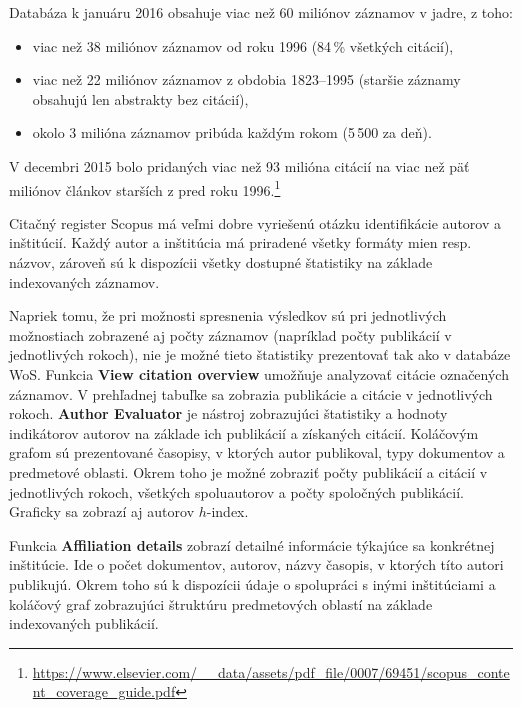 Databáza k januáru 2016 obsahuje viac než 60 miliónov záznamov v jadre, z toho:

\begin{itemize}

\item viac než 38 miliónov záznamov od roku 1996 (84\,\% všetkých citácií),

\item viac než 22 miliónov záznamov z obdobia 1823--1995 (staršie záznamy
  obsahujú len abstrakty bez citácií),

\item okolo 3 milióna záznamov pribúda každým rokom (5\,500 za deň).

\end{itemize}

V decembri 2015 bolo pridaných viac než 93 milióna citácií na viac než päť
miliónov článkov starších z pred roku
1996.\footnote{\url{https://www.elsevier.com/__data/assets/pdf_file/0007/69451/scopus_content_coverage_guide.pdf}}

Citačný register Scopus má veľmi dobre vyriešenú otázku identifikácie autorov a
inštitúcií.  Každý autor a inštitúcia má priradené všetky formáty mien
resp.\,názvov, zároveň sú k dispozícii všetky dostupné štatistiky na základe
indexovaných záznamov.

Napriek tomu, že pri možnosti spresnenia výsledkov sú pri jednotlivých
možnostiach zobrazené aj počty záznamov (napríklad počty publikácií v
jednotlivých rokoch), nie je možné tieto štatistiky prezentovať tak ako v
databáze WoS.  Funkcia \textbf{View citation overview} umožňuje analyzovať
citácie označených záznamov.  V prehľadnej tabuľke sa zobrazia publikácie a
citácie v jednotlivých rokoch.  \textbf{Author Evaluator} je nástroj zobrazujúci
štatistiky a hodnoty indikátorov autorov na základe ich publikácií a získaných
citácií.  Koláčovým grafom sú prezentované časopisy, v ktorých autor publikoval,
typy dokumentov a predmetové oblasti.  Okrem toho je možné zobraziť počty
publikácií a citácií v jednotlivých rokoch, všetkých spoluautorov a počty
spoločných publikácií.  Graficky sa zobrazí aj autorov $h$-index.

Funkcia \textbf{Affiliation details} zobrazí detailné informácie týkajúce sa
konkrétnej inštitúcie.  Ide o počet dokumentov, autorov, názvy časopis, v
ktorých títo autori publikujú.  Okrem toho sú k dispozícii údaje o spolupráci s
inými inštitúciami a koláčový graf zobrazujúci štruktúru predmetových oblastí na
základe indexovaných publikácií.

